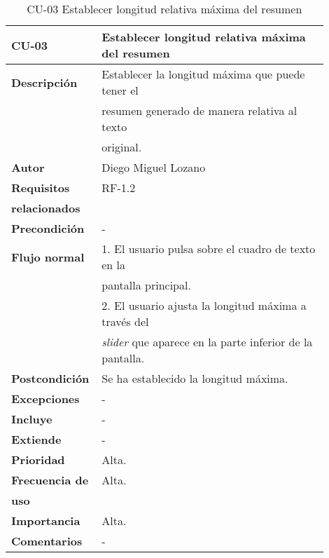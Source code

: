 \begin{longtable}{>{\raggedright}b{0.2\linewidth}>{\raggedright\arraybackslash}b{0.7\linewidth}}
	\toprule
	\textbf{CU-03} & \textbf{Establecer longitud relativa máxima del resumen} \\
	\toprule
	\endhead
	
	\toprule
	\caption{CU-03 Establecer longitud relativa máxima del resumen}
	\endfoot
	
	\small{\textbf{Descripción}} & Establecer la longitud máxima que puede tener el \\
	& resumen generado de manera relativa al texto \\ & original. \\
	\small{\textbf{Autor}} & Diego Miguel Lozano \\
	\small{\textbf{Requisitos}} & RF-1.2  \\
	\small{\textbf{relacionados}} & \\
	\small{\textbf{Precondición}} & - \\
	\small{\textbf{Flujo normal}} & \quad \small{1. El usuario pulsa sobre el cuadro de texto en la} \\
	& \qquad \small{pantalla principal.} \\
	& \quad \small{2. El usuario ajusta la longitud máxima a través del} \\
	& \qquad \small{\emph{slider} que aparece en la parte inferior de la pantalla.} \\
	\small{\textbf{Postcondición}} & Se ha establecido la longitud máxima. \\
	\small{\textbf{Excepciones}} & - \\
	\small{\textbf{Incluye}} & - \\
	\small{\textbf{Extiende}} & - \\
	\small{\textbf{Prioridad}} & Alta. \\
	\small{\textbf{Frecuencia de}} & Alta. \\
	\small{\textbf{uso}} & \\
	\small{\textbf{Importancia}} & Alta. \\
	\small{\textbf{Comentarios}} &  - \\
\end{longtable}



